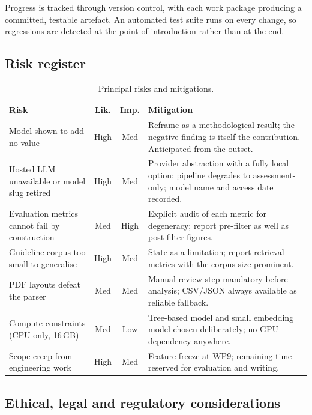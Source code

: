 \documentclass[11pt,a4paper]{article}
\begin{document}
Progress is tracked through version control, with each work package producing a
committed, testable artefact. An automated test suite runs on every change, so
regressions are detected at the point of introduction rather than at the end.

\subsection{Risk register}

\begin{table}[h!]
\centering
\caption{Principal risks and mitigations.\label{tab:risk}}
\renewcommand{\arraystretch}{1.1}
\setlength{\tabcolsep}{4pt}
\begin{tabular}{|p{4.4cm}|c|c|p{7.4cm}|}
\hline
\textbf{Risk} & \textbf{Lik.} & \textbf{Imp.} & \textbf{Mitigation} \\
\hline
Model shown to add no value & High & Med & Reframe as a methodological result; the negative finding is itself the contribution. Anticipated from the outset. \\
\hline
Hosted LLM unavailable or model slug retired & High & Med & Provider abstraction with a fully local option; pipeline degrades to assessment-only; model name and access date recorded. \\
\hline
Evaluation metrics cannot fail by construction & Med & High & Explicit audit of each metric for degeneracy; report pre-filter as well as post-filter figures. \\
\hline
Guideline corpus too small to generalise & High & Med & State as a limitation; report retrieval metrics with the corpus size prominent. \\
\hline
PDF layouts defeat the parser & Med & Med & Manual review step mandatory before analysis; CSV/JSON always available as reliable fallback. \\
\hline
Compute constraints (CPU-only, 16\,GB) & Med & Low & Tree-based model and small embedding model chosen deliberately; no GPU dependency anywhere. \\
\hline
Scope creep from engineering work & High & Med & Feature freeze at WP9; remaining time reserved for evaluation and writing. \\
\hline
\end{tabular}
\end{table}

\subsection{Ethical, legal and regulatory considerations}
\end{document}
